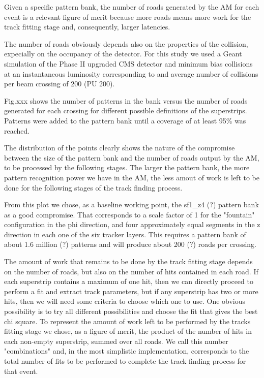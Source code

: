 Given a specific pattern bank, the number of roads generated by the AM for each event is a relevant figure of merit because more roads means more work for the track fitting stage and, consequently, larger latencies. 

The number of roads obviously depends also on the properties of the collision, expecially on the occupancy of the detector. For this study we used a Geant simulation of the Phase II upgraded CMS detector and minimum bias collisions at an instantaneous luminosity corresponding to and average number of collisions per beam crossing of 200 (PU 200).

Fig.xxx shows the number of patterns in the bank versus the number of roads generated for each crossing for different possible definitions of the superstrips. Patterns were added to the pattern bank until a coverage of at least 95\% was reached. 

The distribution of the points clearly shows the nature of the compromise between the size of the pattern bank and the number of roads output by the AM, to be processed by the following stages. The larger the pattern bank, the more pattern recognition power we have in the AM, the less amout of work is left to be done for the following stages of the track finding process.

From this plot we chose, as a baseline working point, the sf1\_z4 (?) pattern bank as a good compromise. That corresponds to a scale factor of 1 for the "fountain" configuration in the phi direction, and four approximately equal segments in the z direction in each one of the six tracker layers. This requires a pattern bank of about 1.6 million (?) patterns and will produce about 200 (?) roads per crossing.

The amount of work that remains to be done by the track fitting stage depends on the number of roads, but also on the number of hits contained in each road. If each superstrip contains a maximum of one hit, then we can directly proceed to perform a fit and extract track parameters, but if any superstrip has two or more hits, then we will need some criteria to choose
which one to use. One obvious possibility is to try all different possibilities and choose the fit that gives the best chi square. To represent the amount of work left to be performed by the tracks fitting stage we chose, as a figure of merit, the product of the number of hits in each non-empty superstrip, summed over all roads. We call this number "combinations" and, in the most simplistic implementation, corresponds to the total number of fits to be performed to complete the track finding process for that event.

